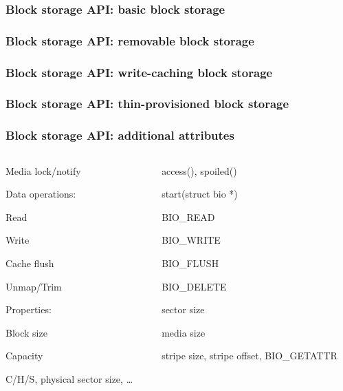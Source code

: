 \documentclass{beamer}
\begin{document}
\begin{frame}
\frametitle<1-2>{Block storage API: basic block storage}
\frametitle<3>{Block storage API: removable block storage}
\frametitle<4>{Block storage API: write-caching block storage}
\frametitle<5>{Block storage API: thin-provisioned block storage}
\frametitle<6>{Block storage API: additional attributes}
\begin{columns}
  \begin{column}{.4\paperwidth}
  \begin{itemize}
 {
  \item{Media lock/notify}
}
  \item{Data operations:
    \begin{itemize}
      \item{Read}
      \item{Write}
 {
      \item{Cache flush}
}
 {
      \item{Unmap/Trim}
}
    \end{itemize}
  }
  \item{Properties:
    \begin{itemize}
      \item{Block size}
      \item{Capacity}
 {
      \item {C/H/S, physical sector size, \ldots}
}
    \end{itemize}
  }
  \end{itemize}
  \end{column}
  \begin{column}{.4\paperwidth}
  \begin{itemize}
 {
  \item{access(), spoiled()}
}
 {
  \item{start(struct bio *)
    \begin{itemize}
      \item{BIO\_READ}
      \item{BIO\_WRITE}
 {
      \item{BIO\_FLUSH}
}
 {
      \item{BIO\_DELETE}
}
    \end{itemize}
  }
    \begin{itemize}
      \item{sector size}
      \item{media size}
 {
      \item {stripe size, stripe offset, BIO\_GETATTR }
}
    \end{itemize}
}
  \end{itemize}
  \end{column}
\end{columns}
\end{frame}
\end{document}
